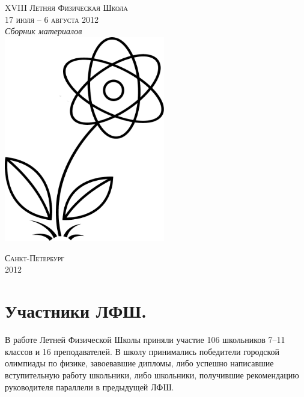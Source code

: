 \documentclass[12pt]{article}
\newlength{\h}
\newlength{\x}
\begin{document}
\thispagestyle{empty}
\parindent=5mm
\begin{center}

\phantom{Бухалкин апанас}

\vfill
\LARGE{\textsc{XVIII Летняя Физическая Школа}}\\
\Large{\textsc{17 июля -- 6 августа 2012}}\\[1cm]
\Large{\textit{Сборник материалов}}\\[2cm]
\includegraphics[width=7cm]{./logo2012.pdf}
\vfill

\small{\textsc{Санкт-Петербург}\\
\textsc{2012}}
\end{center}

\clearpage

\hypersetup{colorlinks,%
  linkcolor=black
}

\tableofcontents

\hypersetup{colorlinks,%
  citecolor=blue,
  urlcolor=blue,
  linkcolor=red
}

\clearpage

\section{Участники ЛФШ. }
\label{sec:participants}

В работе Летней Физической Школы приняли участие 106 школьников 7--11
классов и 16 преподавателей. В школу принимались победители городской
олимпиады по физике, завоевавшие дипломы, либо успешно написавшие
вступительную работу школьники, либо школьники, получившие
рекомендацию руководителя параллели в предыдущей ЛФШ.
\end{document}
